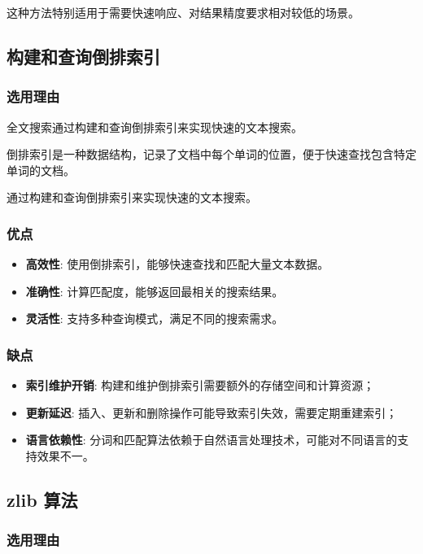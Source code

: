 \documentclass{ctexart}
\begin{document}
这种方法特别适用于需要快速响应、对结果精度要求相对较低的场景。

\subsection{构建和查询倒排索引}

\subsubsection{选用理由}

全文搜索通过构建和查询倒排索引来实现快速的文本搜索。

倒排索引是一种数据结构，记录了文档中每个单词的位置，便于快速查找包含特定单词的文档。

通过构建和查询倒排索引来实现快速的文本搜索。

\subsubsection{优点}

\begin{itemize}
    \item \textbf{高效性}: 使用倒排索引，能够快速查找和匹配大量文本数据。
    \item \textbf{准确性}: 计算匹配度，能够返回最相关的搜索结果。
    \item \textbf{灵活性}: 支持多种查询模式，满足不同的搜索需求。
\end{itemize}

\subsubsection{缺点}

\begin{itemize}
    \item \textbf{索引维护开销}: 构建和维护倒排索引需要额外的存储空间和计算资源；
    \item \textbf{更新延迟}: 插入、更新和删除操作可能导致索引失效，需要定期重建索引；
    \item \textbf{语言依赖性}: 分词和匹配算法依赖于自然语言处理技术，可能对不同语言的支持效果不一。
\end{itemize}

\subsection{zlib 算法}

\subsubsection{选用理由}
\end{document}
